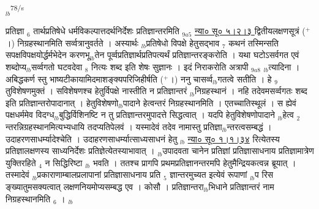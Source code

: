 \documentclass[article,12pt,a4paper]{memoir}%
\newcommand{\add}[1]{($^{+}$#1)}
\newcounter{parCount}
\begin{document}
	{}
	\pend%
      {\tiny $_{lb}$}\textsuperscript{\textenglish{78/s}}

	  
	  \pstart \leavevmode%
	\hphantom{.}प्रतिज्ञा {\tiny $_{6}$} तार्थप्रतिषेधे धर्मविकल्पात्तदर्थनिर्देशः प्रतिज्ञान्तरमिति {\tiny $_{9a5}$} \href{http://sarit.indology.info/?cref=ns\%C5\%AB.5.2.3}{न्या० सू० ५।२।३ } द्वितीयलक्षणसूत्रं \add{।} निग्रहस्थानमिति सर्व्वत्रानुवर्तते । अस्यार्थः {\tiny $_{lb}$}प्रतिषेधो विपक्षे हेतुसद्भाव {\tiny $_{7}$} कथनं तस्मिन्सति सपक्षविपक्षयोर्द्धर्मभेदेन करणभू{\tiny $_{lb}$}तेन पूर्व्वप्रतिज्ञार्थप्रतिपत्यर्थं प्रतिज्ञान्तरङ्करोति । यथा घटोऽसर्वगत एवं शब्दोप्य{\tiny $_{lb}$}सर्व्वगतो घटवदेवा {\tiny $_{8}$} नित्यः शब्द इति शेषः सुज्ञानः । इदं निराकरोति {\color{DodgerBlue3}अत्रापी} {\tiny $_{9a8}$} {\tiny $_{lb}$}त्यादिना । {\color{DodgerBlue3}अबिद्धकर्ण} स्तु भाष्यटीकायामिदमाशङ्क्यपरिजिहीर्षति \add{।} {\color{DodgerBlue3}ननु चासर्व्व{\tiny $_{lb}$}गतत्वे} सतीति । हे {\tiny $_{9}$} \leavevmode{} तुविशेषणमुक्तं । सविशेषणश्च हेतुर्विपक्षे नास्तीति न प्रतिज्ञान्तरं {\tiny $_{lb}$}निग्रहस्थानं । नहि तदेवमसर्व्वगतः शब्द इति प्रतिज्ञान्तरोपादानात् । हेतुविशेषणो{\tiny $_{lb}$}पादाने हेत्वन्तरं निग्रहस्थानमिति । एतच्चातिस्थूलं । स ह्येवं पक्षधर्ममेव विदग्ध{\tiny $_{lb}$}बुद्धिर्विशिनष्टि न तु प्रतिज्ञान्तरमुपादत्ते सिद्धत्वात् । यदपि हेतुविशेषणोपादाने {\tiny $_{lb}$}हेत्व {\tiny $_{2}$} न्तरन्निग्रहस्थानमित्यभ्यधायि तदप्यतिपेलवं । यस्मादेवं तदेव नामास्तु प्रतिज्ञा{\tiny $_{lb}$}न्तरत्वसम्बद्धं । उदाहरणसाधर्म्यादेश्चेति । उदाहरणसाधर्म्यात्साध्यसाधनं हेतु {\tiny $_{lb}$} \href{http://sarit.indology.info/?cref=ns\%C5\%AB.1.1.34}{न्या० सू० १।१।३४} रित्येतस्य प्रतिज्ञालक्षणस्य साध्यनिर्देशः प्रतिज्ञेत्येतस्याभावात् । {\tiny $_{lb}$}उपादवता चानेन प्रतिज्ञां प्रतिज्ञासाधनाय प्रतिज्ञामात्रेण युक्तिरहिते {\tiny $_{4}$} न सिद्धिरिष्टा {\tiny $_{lb}$} \leavevmode{} भवति । ततश्च प्रागपि प्रथमप्रतिज्ञानन्तरमपि हेतुमैन्द्रियकत्वन्न ब्रूयात् । तस्मादेवं {\tiny $_{lb}$}प्रकाराणाम्बालप्रलापानां प्रतिज्ञासाधनाय प्रति {\tiny $_{5}$} ज्ञान्तरमुच्यत इत्येवं रूपाणां {\tiny $_{lb}$}प रिस ङ्ख्यातुमसक्यत्वात् लक्षणनियमोप्यसम्बद्ध एव । कोसौ । प्रतिज्ञान्तरा{\tiny $_{lb}$}भिधाने प्रतिज्ञान्तरं नाम निग्रहस्थानमिति {\tiny $_{6}$} ।
	{}
	\pend%
      {\tiny $_{lb}$}
\end{document}
